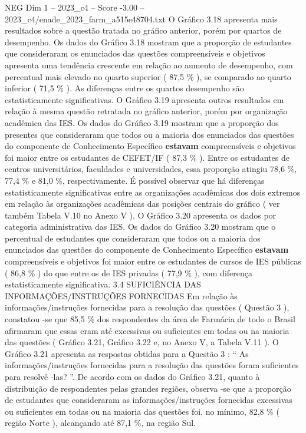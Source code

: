 \begin{textsample}{NEG Dim 1 – 2023\_c4 – Score -3.00 – 2023\_c4/enade\_2023\_farm\_a515e48704.txt}
O Gráfico 3.18 apresenta mais resultados sobre a questão tratada no gráfico anterior, porém por quartos de desempenho.
Os dados do Gráfico 3.18 mostram que a proporção de estudantes que consideraram os enunciados das questões compreensíveis e objetivos apresenta uma tendência crescente em relação ao aumento de desempenho, com percentual mais elevado no quarto superior ( 87,5 \% ), se comparado ao quarto inferior ( 71,5 \% ).
As diferenças entre os quartos desempenho são estatisticamente significativas.
O Gráfico 3.19 apresenta outros resultados em relação à mesma questão retratada no gráfico anterior, porém por organização acadêmica das IES.
Os dados do Gráfico 3.19 mostram que a proporção dos presentes que consideraram que todos ou a maioria dos enunciados das questões do componente de Conhecimento Específico \textbf{estavam} compreensíveis e objetivos foi maior entre os estudantes de CEFET/IF ( 87,3 \% ).
Entre os estudantes de centros universitários, faculdades e universidades, essa proporção atingiu 78,6 \%, 77,4 \% e 81,0 \%, respectivamente.
É possível observar que há diferenças estatisticamente significativas entre as organizações acadêmicas dos dois extremos em relação às organizações acadêmicas das posições centrais do gráfico ( ver também Tabela V.10 no Anexo V ).
O Gráfico 3.20 apresenta os dados por categoria administrativa das IES.
Os dados do Gráfico 3.20 mostram que o percentual de estudantes que consideraram que todos ou a maioria dos enunciados das questões do componente de Conhecimento Específico \textbf{estavam} compreensíveis e objetivos foi maior entre os estudantes de cursos de IES públicas ( 86,8 \% ) do que entre os de IES privadas ( 77,9 \% ), com diferença estatisticamente significativa. 3.4 SUFICIÊNCIA DAS INFORMAÇÕES/INSTRUÇÕES FORNECIDAS Em relação às informações/instruções fornecidas para a resolução das questões ( Questão 3 ), constatou -se que 85,5 \% dos respondentes da área de Farmácia de todo o Brasil afirmaram que essas eram até excessivas ou suficientes em todas ou na maioria das questões ( Gráfico 3.21, Gráfico 3.22 e, no Anexo V, a Tabela V.11 ).
O Gráfico 3.21 apresenta as respostas obtidas para a Questão 3 : “ As informações/instruções fornecidas para a resolução das questões foram suficientes para resolvê -las? ”.
De acordo com os dados do Gráfico 3.21, quanto à distribuição de respondentes pelas grandes regiões, observa -se que a proporção de estudantes que consideraram as informações/instruções fornecidas excessivas ou suficientes em todas ou na maioria das questões foi, no mínimo, 82,8 \% ( região Norte ), alcançando até 87,1 \%, na região Sul.

\end{textsample}
